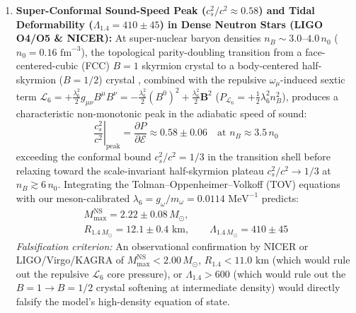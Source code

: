 \documentclass[10pt,aps,prd,twocolumn,superscriptaddress,nofootinbib,floatfix,longbibliography,showkeys]{revtex4-2}
\begin{document}
\begin{enumerate}
  \item \textbf{Super-Conformal Sound-Speed Peak ($c_s^2 / c^2 \approx 0.58$) and Tidal Deformability ($\Lambda_{1.4} = 410 \pm 45$) in Dense Neutron Stars (LIGO O4/O5 \& NICER):}
  At super-nuclear baryon densities $n_B \sim 3.0\text{--}4.0\,n_0$ ($n_0 = 0.16\text{ fm}^{-3}$), the topological parity-doubling transition from a face-centered-cubic (FCC) $B=1$ skyrmion crystal to a body-centered half-skyrmion ($B=1/2$) crystal \cite{ref48,ref49}, combined with the repulsive $\omega_\mu$-induced sextic term $\mathcal{L}_6 = +\frac{\lambda_6^2}{2}g_{\mu\nu}B^\mu B^\nu = -\frac{\lambda_6^2}{2}(B^0)^2 + \frac{\lambda_6^2}{2}\mathbf{B}^2$ ($P_{\mathcal{L}_6} = +\frac{1}{2}\lambda_6^2 n_B^2$), produces a characteristic non-monotonic peak in the adiabatic speed of sound:
\begin{equation}
\left.\frac{c_s^2}{c^2}\right|_{\text{peak}} = \frac{\partial P}{\partial \mathcal{E}} \approx 0.58 \pm 0.06 \quad \text{at } n_B \approx 3.5\,n_0
\end{equation}
  exceeding the conformal bound $c_s^2/c^2 = 1/3$ in the transition shell before relaxing toward the scale-invariant half-skyrmion plateau $c_s^2/c^2 \to 1/3$ at $n_B \gtrsim 6\,n_0$. Integrating the Tolman--Oppenheimer--Volkoff (TOV) equations with our meson-calibrated $\lambda_6 = g_\omega/m_\omega = 0.0114\text{ MeV}^{-1}$ predicts:
\begin{equation}\begin{gathered}
M_{\max}^{\text{NS}} = 2.22 \pm 0.08\,M_\odot, \\
R_{1.4\,M_\odot} = 12.1 \pm 0.4\text{ km}, \qquad \Lambda_{1.4\,M_\odot} = 410 \pm 45
\end{gathered}\end{equation}
  \textit{Falsification criterion:} An observational confirmation by NICER or LIGO/Virgo/KAGRA of $M_{\max}^{\text{NS}} < 2.00\,M_\odot$, $R_{1.4} < 11.0\text{ km}$ (which would rule out the repulsive $\mathcal{L}_6$ core pressure), or $\Lambda_{1.4} > 600$ (which would rule out the $B=1 \to B=1/2$ crystal softening at intermediate density) would directly falsify the model's high-density equation of state.


\end{enumerate}
\end{document}
